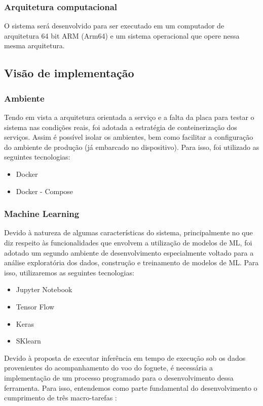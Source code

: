 \subsubsection{Arquitetura computacional}
O sistema será desenvolvido para ser executado em um computador de arquitetura 64 bit ARM (Arm64) e um sistema operacional que opere nessa mesma arquitetura. \cite{arquitetura_arm}

\subsection{Visão de implementação}
\subsubsection{Ambiente}
Tendo em vista a arquitetura orientada a serviço e a falta da placa para testar o sistema nas condições reais, foi adotada a estratégia de conteinerização dos serviços. Assim é possível isolar os ambientes, bem como facilitar a configuração do ambiente de produção (já embarcado no dispositivo). Para isso, foi utilizado as seguintes tecnologias:

\begin{itemize}
    \item Docker \cite{docker}
    \item Docker - Compose \cite{docker-compose}
\end{itemize}


\subsubsection{Machine Learning}
Devido à natureza de algumas características do sistema, principalmente no que diz respeito às funcionalidades que envolvem a utilização de modelos de ML, foi adotado um segundo ambiente de desenvolvimento especialmente voltado para a análise exploratória dos dados, construção e treinamento de modelos de ML. Para isso, utilizaremos as seguintes tecnologias:

\begin{itemize}
    \item Jupyter Notebook \cite{jupyter-notebook}
    \item Tensor Flow \cite{tensorflow}
    \item Keras \cite{keras}
    \item SKlearn \cite{scikit}
\end{itemize}

Devido à proposta de executar inferência em tempo de execução sob os dados provenientes do acompanhamento do voo do foguete, é necessária a implementação de um processo programado para o desenvolvimento dessa ferramenta. Para isso, entendemos como parte fundamental do desenvolvimento o cumprimento de três macro-tarefas : 

